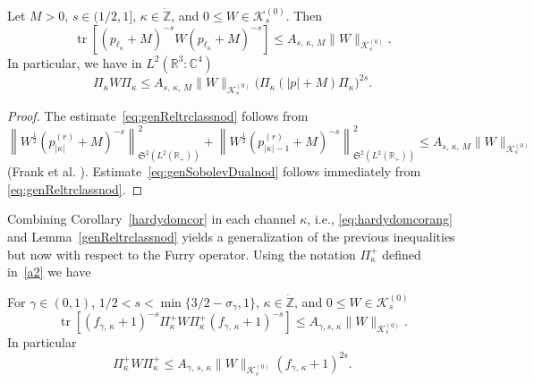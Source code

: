 \documentclass[AHL,Unicode,longabstracts,published]{cedram}
\DeclareMathOperator{\tr}{tr}
\newcommand*\cz{\mathbb{C}}
\newcommand*\gz{\mathbb{Z}}
\newcommand*\rz{\mathbb{R}}
\newcommand*\zp{\dot{\gz}}
\newcommand*\cK{\mathcal{K}}
\newcommand*\gS{\mathfrak{S}}
\begin{document}
\begin{lemm}\label{genReltrclassnod}
Let $M>0$, $s\in(1/2,1]$, $\kappa\in\zp$, and $0\leq W \in\cK_{s}^{(0)}$. Then
\begin{equation}\label{eq:genReltrclassnod}
\tr\left[\left(p_{\ell_\kappa}+M\right)^{-s}W\left(p_{\ell_\kappa}+M\right)^{-s}\right]
\leq A_{s,\,\kappa,\,M} \|W\|_{\cK_{s}^{(0)}}.
\end{equation}
In particular, we have in $L^2(\rz^3:\cz^4)$
\begin{equation}\label{eq:genSobolevDualnod}
\Pi_{\kappa} W\Pi_{\kappa}
\leq A_{s,\,\kappa,\,M} \|W\|_{\cK_{s}^{(0)}} \big(\Pi_{\kappa}(|p|+M)\Pi_{\kappa}\big)^{2s}.
\end{equation}
\end{lemm}

\begin{proof}
The estimate~\eqref{eq:genReltrclassnod} follows from
\[
\left\|W^{\frac12}\left(p_{|\kappa|}^{(r)}+M\right)^{-s}\right\|_{\gS^2\left(L^2\left(\rz_+\right)\right)}^2 + \left\|W^{\frac12}\left(p_{|\kappa|-1}^{(r)}+M\right)^{-s}\right\|_{\gS^2\left(L^2\left(\rz_+\right)\right)}^2
\leq A_{s,\,\kappa,\,M} \|W\|_{\cK_{s}^{(0)}}
\]
(Frank et al. \cite[Proposition~4.4]{Franketal2020P}). Estimate~\eqref{eq:genSobolevDualnod} follows immediately from \eqref{eq:genReltrclassnod}.
\end{proof}

Combining Corollary~\ref{hardydomcor} in each channel $\kappa$, i.e., \eqref{eq:hardydomcorang} and Lemma~\ref{genReltrclassnod} yields a generalization of the previous inequalities but now with respect to the Furry operator. Using the notation $\Pi^+_\kappa$ defined in~\eqref{a2} we have
\begin{lemm}\label{genReltrclassHydro}
For $\gamma\in(0,1)$, $1/2<s<\min\{3/2-\sigma_\gamma,1\}$, $\kappa\in\zp$, and \linebreak$0\leq W \in\cK_{s}^{(0)}$
\begin{equation}\label{eq:genReltrclassHydro}
\tr\left[\left(f_{\gamma,\,\kappa}+1\right)^{-s}\Pi^+_\kappa W\Pi^+_{\kappa} \left(f_{\gamma,\,\kappa}+1\right)^{-s}\right]
\leq A_{\gamma,s,\,\kappa} \|W\|_{\cK_{s}^{(0)}}.
\end{equation}
In particular
\begin{equation}\label{eq:genSobolevDualHydro}
\Pi_{\kappa}^+W\Pi_{\kappa}^+
\leq A_{\gamma,\,s,\,\kappa} \|W\|_{\cK_{s}^{(0)}} \left(f_{\gamma,\,\kappa}+1\right)^{2s}.
\end{equation}
\end{lemm}
\end{document}
